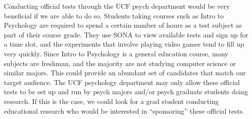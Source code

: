 Conducting official tests through the UCF psych department would be very beneficial if we are able to do so.
Students taking courses such as Intro to Psychology are required to spend a certain number of hours as a test subject as part of their course grade. They use SONA to view available tests and sign up for a time slot, and the experiments that involve playing video games tend to fill up very quickly.
Since Intro to Psychology is a general education course, many subjects are freshman, and the majority are not studying computer science or similar majors. This could provide an abundant set of candidates that match our target audience.
The UCF psychology department may only allow these official tests to be set up and run by psych majors and/or psych graduate students doing research. If this is the case, we could look for a grad student conducting educational research who would be interested in “sponsoring” these official tests.







